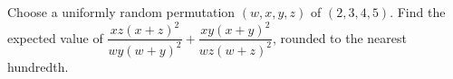 Choose a uniformly random permutation $(w,x,y,z)$ of $(2,3,4,5)$. Find the expected value of $\dfrac{xz(x+z)^2}{wy(w+y)^2}+\dfrac{xy(x+y)^2}{wz(w+z)^2}$, rounded to the nearest hundredth.
